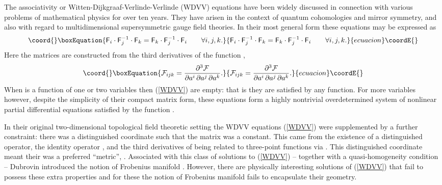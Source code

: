\documentclass[a4paper,]{article}
\def\d{\partial}
\def\F{{\cal F}}
\def\f{{\sf F}}
\begin{document}
The associativity or Witten-Dijkgraaf-Verlinde-Verlinde (WDVV) equations
\cite{WDVV} have been widely discussed in connection with various problems of
mathematical physics for over ten years. They have arisen in the context of
quantum cohomologies and mirror symmetry, and also with regard to
multidimensional supersymmetric gauge field theories.
In their most general form these equations may be expressed as \cite{MMM}
\begin{equation}\coord{}\boxEquation{
\label{WDVV}
\f_i\cdot \f_j^{-1}\cdot\f_k = \f_k\cdot \f_j^{-1}\cdot\f_i
\qquad \forall i,j,k. 
}{
\f_i\cdot \f_j^{-1}\cdot\f_k = \f_k\cdot \f_j^{-1}\cdot\f_i
\qquad \forall i,j,k. 
}{ecuacion}\coordE{}\end{equation}
Here the matrices \myHighlight{$\|\f_i\|_{jk} \equiv \F_{ijk}$}\coordHE{} are constructed from the
third derivatives of the function \myHighlight{$\F({\bf a})$}\coordHE{},
\begin{equation}\coord{}\boxEquation{
\label{thirdder}
\F_{ijk} =\dfrac{\d^3\F}{\d a\sp{i}\,\d a\sp{j}\,\d a\sp{k}}.
}{
\F_{ijk} =\dfrac{\d^3\F}{\d a\sp{i}\,\d a\sp{j}\,\d a\sp{k}}.
}{ecuacion}\coordE{}\end{equation}
When \myHighlight{$\F$}\coordHE{} is a function of one or two variables then (\ref{WDVV}) are empty:
that is they are satisfied by any function. For more variables however,
despite the simplicity of their compact matrix form, these equations
form a highly nontrivial overdetermined system of nonlinear partial
differential equations satisfied by the function \myHighlight{$\F$}\coordHE{}.

In their original two-dimensional topological field theoretic setting
the WDVV equations (\ref{WDVV}) were supplemented by a further constraint:
there was a distinguished coordinate such that the matrix
\myHighlight{$\F_{1jk}$}\coordHE{} was a constant.
This came from the existence of a distinguished operator, the identity
operator \coordHE{}, and the third derivatives of \myHighlight{$\F$}\coordHE{} being related to 
three-point functions via
\myHighlight{$\langle \Phi_i\Phi_j\Phi_k\rangle=  \F_{ijk}$}\coordHE{}. 
This distinguished coordinate meant their was a preferred ``metric'', \myHighlight{$\f_1$}\coordHE{}.
Associated with this class of solutions to (\ref{WDVV}) -- together with
a quasi-homogeneity condition -- Dubrovin introduced the notion of
Frobenius manifold \cite{Dub}. However, there are physically
interesting solutions of (\ref{WDVV}) that fail to possess these extra
properties and for these the notion of Frobenius manifold fails to 
encapsulate their geometry.
\end{document}
